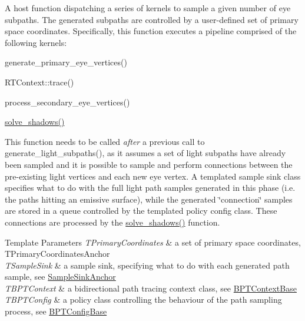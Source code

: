 \begin{DoxyParagraph}{}
A host function dispatching a series of kernels to sample a given number of eye subpaths. The generated subpaths are controlled by a user-\/defined set of primary space coordinates. Specifically, this function executes a pipeline comprised of the following kernels\+: ~\newline

\begin{DoxyItemize}
\item generate\+\_\+primary\+\_\+eye\+\_\+vertices()
\item R\+T\+Context\+::trace()
\item process\+\_\+secondary\+\_\+eye\+\_\+vertices()
\item \hyperlink{group___b_p_t_lib_ga67c2c1dbc4ee8212daf3728fafe55969}{solve\+\_\+shadows()} 
\end{DoxyItemize}
\end{DoxyParagraph}
\begin{DoxyParagraph}{}
This function needs to be called {\itshape after} a previous call to generate\+\_\+light\+\_\+subpaths(), as it assumes a set of light subpaths have already been sampled and it is possible to sample and perform connections between the pre-\/existing light vertices and each new eye vertex. A templated sample sink class specifies what to do with the full light path samples generated in this phase (i.\+e. the paths hitting an emissive surface), while the generated \char`\"{}connection\char`\"{} samples are stored in a queue controlled by the templated policy config class. These connections are processed by the \hyperlink{group___b_p_t_lib_ga67c2c1dbc4ee8212daf3728fafe55969}{solve\+\_\+shadows()} function.
\end{DoxyParagraph}

\begin{DoxyTemplParams}{Template Parameters}
{\em T\+Primary\+Coordinates} & a set of primary space coordinates, T\+Primary\+Coordinates\+Anchor \\
\hline
{\em T\+Sample\+Sink} & a sample sink, specifying what to do with each generated path sample, see \hyperlink{struct_sample_sink_base_SampleSinkAnchor}{Sample\+Sink\+Anchor} \\
\hline
{\em T\+B\+P\+T\+Context} & a bidirectional path tracing context class, see \hyperlink{struct_b_p_t_context_base}{B\+P\+T\+Context\+Base} \\
\hline
{\em T\+B\+P\+T\+Config} & a policy class controlling the behaviour of the path sampling process, see \hyperlink{struct_b_p_t_config_base}{B\+P\+T\+Config\+Base} \\
\hline
\end{DoxyTemplParams}
\mbox{\label{group___b_p_t_lib_ga679afc8704a42ed1c8e6b57018cd676e}} 
